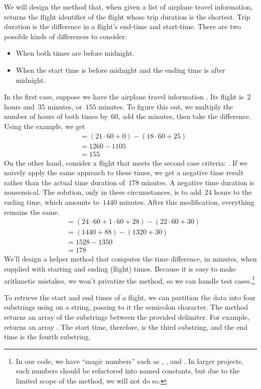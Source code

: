 We will design the  method that, when given a list of airplane travel information, returns the flight identifier of the flight whose trip duration is the shortest.
Trip duration is the difference in a flight's end-time and start-time. 
There are two possible kinds of differences to consider:
\begin{itemize}
  \item When both times are before midnight.
  \item When the start time is before midnight and the ending time is after midnight.
\end{itemize}
In the first case, suppose we have the airplane travel information .
Its flight is~$2$ hours and~$35$ minutes, or~$155$ minutes.
To figure this out, we multiply the number of hours of both times by~$60$, add the minutes, then take the difference.
Using the example, we get
\begin{align*}
  &= (21\cdot{60} + 0) - (18\cdot{60} + 25)\\
  &= 1260 - 1105\\
  &= 155
\end{align*}
On the other hand, consider a flight that meets the second case criteria: .
If we naively apply the same approach to these times, we get a negative time result rather than the actual time duration of~$178$ minutes.
A negative time duration is nonsensical.
The solution, only in these circumstances, is to add~$24$ hours to the ending time, which amounts to~$1440$ minutes.
After this modification, everything remains the same.
\begin{align*}
 &= (24\cdot{60} + 1\cdot{60} + 28) - (22\cdot{60} + 30)\\
 &= (1440 + 88) - (1320+30)\\
 &= 1528 - 1350\\
 &= 178
\end{align*}
We'll design a helper method that computes the time difference, in minutes, when supplied with starting and ending (flight) times.
Because it is easy to make arithmetic mistakes, we won't privatize the method, so we can handle test cases.\footnote{In our code, we have ``magic numbers'' such as , , and . In larger projects, such numbers should be refactored into named constants, but due to the limited scope of the method, we will not do so.}

To retrieve the start and end times of a flight, we can partition the data into four substrings using  on a string, passing to it the semicolon character.
The  method returns an array of the substrings between the provided delimiter.
For example,  returns an array \ttt{["123", "456", "789", "012"]}.
The start time, therefore, is the third substring, and the end time is the fourth substring.

